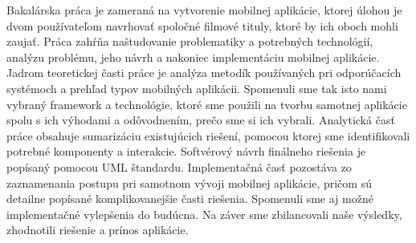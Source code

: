 Bakalárska práca je zameraná na vytvorenie mobilnej aplikácie, ktorej úlohou je dvom používateľom navrhovať spoločné filmové tituly, ktoré by ich oboch mohli zaujať. Práca zahŕňa naštudovanie problematiky a potrebných technológií, analýzu problému, jeho návrh a nakoniec implementáciu mobilnej aplikácie.
Jadrom teoretickej časti práce je analýza metodík používaných pri odporúčacích systémoch a prehľad typov mobilných aplikácii. Spomenuli sme tak isto nami vybraný framework a technológie, ktoré sme použili na tvorbu samotnej aplikácie spolu s ich výhodami a odôvodnením, prečo sme si ich vybrali. Analytická časť práce obsahuje sumarizáciu existujúcich riešení, pomocou ktorej sme identifikovali potrebné komponenty a interakcie. Softvérový návrh finálneho riešenia je popísaný pomocou UML štandardu.
Implementačná časť pozostáva zo zaznamenania postupu pri samotnom vývoji mobilnej aplikácie, pričom sú detailne popísané komplikovanejšie časti riešenia. Spomenuli sme aj možné implementačné vylepšenia do budúcna. Na záver sme zbilancovali naše výsledky, zhodnotili riešenie a prínos aplikácie.